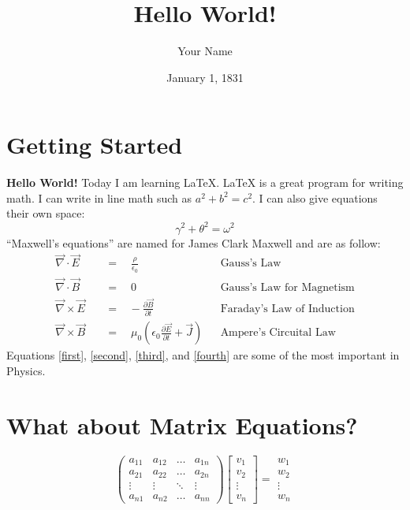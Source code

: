 \documentclass[]{article}
\title{Hello World!}
\author{Your Name}
\date{January 1, 1831}
\begin{document}
	\maketitle %
	\section{Getting Started}
	\textbf{Hello World!} Today I am learning \LaTeX. \LaTeX{} is a great program for writing math. I can write in line math such as $a^2+b^2=c^2$. I can also give equations their own space:
	\begin{equation} 
		\gamma^2+\theta^2=\omega^2
	\end{equation}
	``Maxwell's equations'' are named for James Clark Maxwell and are as follow:
	\begin{align}             
		\vec{\nabla} \cdot \vec{E} \quad &=\quad\frac{\rho}{\epsilon_0} &&\text{Gauss's Law} \label{first}\\      
		\vec{\nabla} \cdot \vec{B} \quad &=\quad 0 &&\text{Gauss's Law for Magnetism} \label{second}\\
		\vec{\nabla} \times \vec{E} \quad &=\hspace{10pt}-\frac{\partial{\vec{B}}}{\partial{t}} &&\text{Faraday's Law of Induction} \label{third}\\ 
		\vec{\nabla} \times \vec{B} \quad &=\quad \mu_0\left( \epsilon_0\frac{\partial{\vec{E}}}{\partial{t}}+\vec{J}\right) &&\text{Ampere's Circuital Law} \label{fourth}
	\end{align}
	Equations \ref{first}, \ref{second}, \ref{third}, and \ref{fourth} are some of the most important in Physics.
	\section{What about Matrix Equations?}
	\begin{equation*}
		\begin{pmatrix}
			a_{11}&a_{12}&\dots&a_{1n}\\
			a_{21}&a_{22}&\dots&a_{2n}\\
			\vdots&\vdots&\ddots&\vdots\\
			a_{n1}&a_{n2}&\dots&a_{nn}
		\end{pmatrix}
		\begin{bmatrix}
			v_{1}\\
			v_{2}\\
			\vdots\\
			v_{n}
		\end{bmatrix}
		=
		\begin{matrix}
			w_{1}\\
			w_{2}\\
			\vdots\\
			w_{n}
		\end{matrix}
	\end{equation*}
\end{document}

